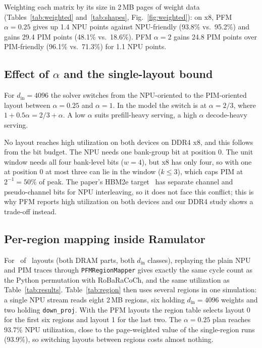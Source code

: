 \documentclass[conference]{IEEEtran}
\begin{document}
Weighting each matrix by its size in 2\,MB pages of weight data (Tables~\ref{tab:weighted} and~\ref{tab:shapes}, Fig.~\ref{fig:weighted}): on x8, PFM $\alpha{=}0.25$ gives up 1.4 NPU points against NPU-friendly (93.8\% vs.\ 95.2\%) and gains 29.4 PIM points (48.1\% vs.\ 18.6\%). PFM $\alpha{=}2$ gains 24.8 PIM points over PIM-friendly (96.1\% vs.\ 71.3\%) for 1.1 NPU points.

\subsection{Effect of $\alpha$ and the single-layout bound}
For $d_{\mathrm{in}}{=}4096$ the solver switches from the NPU-oriented to the PIM-oriented layout between $\alpha{=}0.25$ and $\alpha{=}1$. In the model the switch is at $\alpha=2/3$, where $1+0.5\alpha = 2/3+\alpha$. A low $\alpha$ suits prefill-heavy serving, a high $\alpha$ decode-heavy serving.

No layout reaches high utilization on both devices on DDR4 x8, and this follows from the bit budget. The NPU needs one bank-group bit at position 0. The unit window needs all four bank-level bits ($w{=}4$), but x8 has only four, so with one at position 0 at most three can lie in the window ($k{\le}3$), which caps PIM at $2^{-1}=50\%$ of peak. The paper's HBM2e target~\cite{zhao2026pfm} has separate channel and pseudo-channel bits for NPU interleaving, so it does not face this conflict; this is why PFM reports high utilization on both devices and our DDR4 study shows a trade-off instead.

\subsection{Per-region mapping inside Ramulator}
\label{sec:region}


For \eqok\ of \eqall\ layouts (both DRAM parts, both $d_{\mathrm{in}}$ classes), replaying the plain NPU and PIM traces through \texttt{PFMRegionMapper} gives exactly the same cycle count as the Python permutation with RoBaRaCoCh, and the same utilization as Table~\ref{tab:results}. Table~\ref{tab:region} then uses several regions in one simulation: a single NPU stream reads eight 2\,MB regions, six holding $d_{\mathrm{in}}{=}4096$ weights and two holding \texttt{down\_proj}. With the PFM layouts the region table selects layout 0 for the first six regions and layout 1 for the last two. The $\alpha{=}0.25$ plan reaches 93.7\% NPU utilization, close to the page-weighted value of the single-region runs (93.9\%), so switching layouts between regions costs almost nothing.
\end{document}
